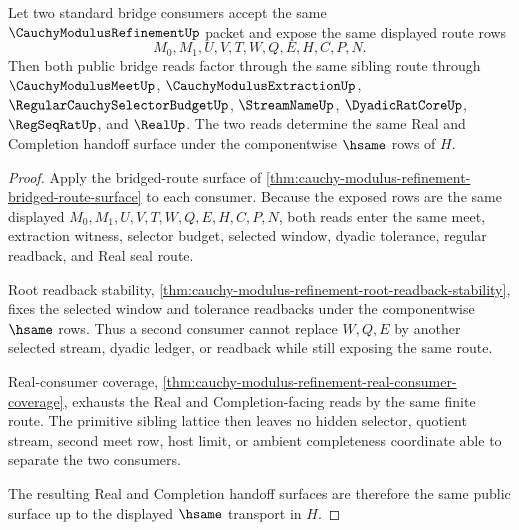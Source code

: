 \begin{theorem}
\label{thm:cauchy-modulus-refinement-bridged-route-determinacy}
Let two standard bridge consumers accept the same $\CauchyModulusRefinementUp$ packet and expose the same displayed route rows
$$
M_0,M_1,U,V,T,W,Q,E,H,C,P,N.
$$
Then both public bridge reads factor through the same sibling route through $\CauchyModulusMeetUp$, $\CauchyModulusExtractionUp$, $\RegularCauchySelectorBudgetUp$, $\StreamNameUp$, $\DyadicRatCoreUp$, $\RegSeqRatUp$, and $\RealUp$. The two reads determine the same Real and Completion handoff surface under the componentwise $\hsame$ rows of $H$.
\end{theorem}
\begin{proof}
Apply the bridged-route surface of \autoref{thm:cauchy-modulus-refinement-bridged-route-surface} to each consumer. Because the exposed rows are the same displayed $M_0,M_1,U,V,T,W,Q,E,H,C,P,N$, both reads enter the same meet, extraction witness, selector budget, selected window, dyadic tolerance, regular readback, and Real seal route.

Root readback stability, \autoref{thm:cauchy-modulus-refinement-root-readback-stability}, fixes the selected window and tolerance readbacks under the componentwise $\hsame$ rows. Thus a second consumer cannot replace $W,Q,E$ by another selected stream, dyadic ledger, or readback while still exposing the same route.

Real-consumer coverage, \autoref{thm:cauchy-modulus-refinement-real-consumer-coverage}, exhausts the Real and Completion-facing reads by the same finite route. The primitive sibling lattice then leaves no hidden selector, quotient stream, second meet row, host limit, or ambient completeness coordinate able to separate the two consumers.

The resulting Real and Completion handoff surfaces are therefore the same public surface up to the displayed $\hsame$ transport in $H$.
\end{proof}

